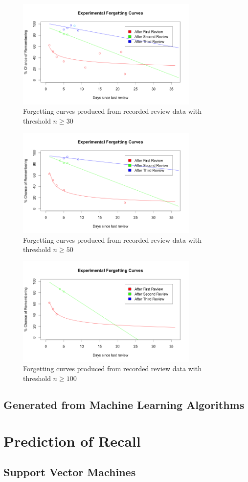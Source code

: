 \begin{figure}[h!]
\includegraphics[width=9cm]{img/forgetcurve_30.png}
\caption{Forgetting curves produced from recorded review data with threshold $n \geq 30$}
\label{fig_forgetcurve_30}
\end{figure}

\begin{figure}[h!]
\includegraphics[width=9cm]{img/forgetcurve_50.png}
\caption{Forgetting curves produced from recorded review data with threshold $n \geq 50$}
\label{fig_forgetcurve_50}
\end{figure}

\begin{figure}[h!]
\includegraphics[width=9cm]{img/forgetcurve_100.png}
\caption{Forgetting curves produced from recorded review data with threshold $n \geq 100$}
\label{fig_forgetcurve_100}
\end{figure}


\subsection*{Generated from Machine Learning Algorithms}

\section{Prediction of Recall}


\subsection*{Support Vector Machines}
